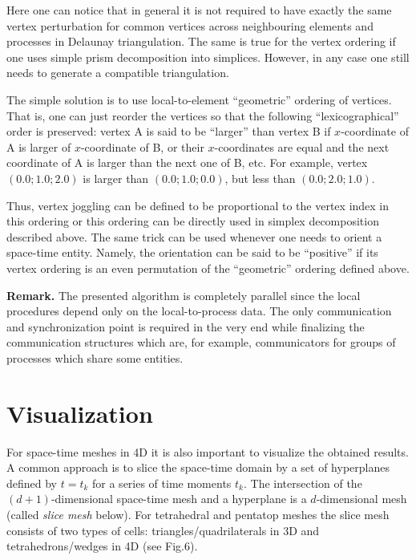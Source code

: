 \documentclass[12pt]{article}
\begin{document}
Here one can notice that in general it is not required to have exactly the same vertex perturbation for common vertices across neighbouring elements and processes in Delaunay triangulation. The same is true for the vertex ordering if one uses simple prism decomposition into simplices. However, in any case one still needs to generate a compatible triangulation.

The simple solution is to use local-to-element ``geometric'' ordering of vertices. That is, one can just reorder the vertices so that the following ``lexicographical'' order is preserved: vertex A is said to be ``larger'' than vertex B if $x$-coordinate of A is larger of $x$-coordinate of B, or their $x$-coordinates are equal and the next coordinate of A is larger than the next one of B, etc. For example, vertex $(0.0; 1.0; 2.0)$ is larger than $(0.0; 1.0; 0.0)$, but less than $(0.0; 2.0; 1.0)$. 

Thus, vertex joggling can be defined to be proportional to the vertex index in this ordering or this ordering can be directly used in simplex decomposition described above. The same trick can be used whenever one needs to orient a space-time entity. Namely, the orientation can be said to be ``positive'' if its vertex ordering is an even permutation of the ``geometric'' ordering defined above.

\textbf{Remark.} The presented algorithm is completely parallel since the local procedures depend only on the local-to-process data. The only communication and synchronization point is required in the very end while finalizing the communication structures which are, for example, communicators for groups of processes which share some entities.

\section{Visualization}
For space-time meshes in 4D it is also important to visualize the obtained results. A common approach  is to slice the space-time domain by a set of hyperplanes defined by $t=t_k$ for a series of time moments $t_k$. The intersection of the $(d+1)$-dimensional space-time mesh and a hyperplane is a $d$-dimensional mesh (called \textit{slice mesh} below). For tetrahedral and pentatop meshes the slice mesh consists of two types of cells: triangles/quadrilaterals in 3D and tetrahedrons/wedges in 4D (see Fig.6).
\end{document}
